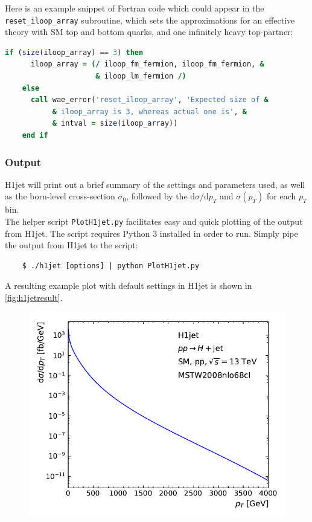 \documentclass[12pt,a4wide]{article}
\begin{document}
Here is an example snippet of Fortran code which could appear in the \texttt{reset\_iloop\_array} subroutine, which sets the approximations for an effective theory with SM top and bottom quarks, and one infinitely heavy top-partner: 
\begin{lstlisting}[language=Fortran, 
                   keywordstyle=\color{Red},
                   stringstyle=\color{Green},
                   identifierstyle=\color{Blue},
                   showstringspaces=false]
    if (size(iloop_array) == 3) then
      iloop_array = (/ iloop_fm_fermion, iloop_fm_fermion, &
                     & iloop_lm_fermion /)
    else
      call wae_error('reset_iloop_array', 'Expected size of &
           & iloop_array is 3, whereas actual one is', &
           & intval = size(iloop_array))
    end if
\end{lstlisting}

\subsubsection{Output}
H1jet will print out a brief summary of the settings and parameters used, as well as the born-level cross-section $\sigma_0$, followed by the $\mathrm{d}\sigma/\mathrm{d}p_{T}$ and $\sigma(p_{T})$ for each $p_T$ bin. \\ 

The helper script \texttt{PlotH1jet.py} facilitates easy and quick plotting of the output from H1jet. The script requires Python 3 installed in order to run. Simply pipe the output from H1jet to the script: 
\begin{lstlisting}
	$ ./h1jet [options] | python PlotH1jet.py 
\end{lstlisting}
A resulting example plot with default settings in H1jet is shown in \autoref{fig:h1jetresult}. 

\begin{figure}[tbh] 
  \centering
  \includegraphics[width=0.6\linewidth]{figures/h1jetresult}
  \label{fig:h1jetresult}
\end{figure}
\end{document}
